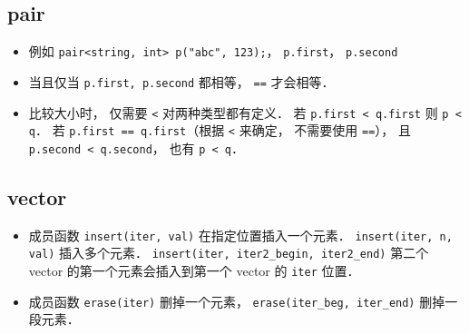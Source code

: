 
\begin{issues}
\issueDraft
\end{issues}

\subsection{pair}
\begin{itemize}
\item 例如 \verb|pair<string, int> p("abc", 123);|， \verb|p.first|， \verb|p.second|
\item 当且仅当 \verb|p.first, p.second| 都相等， \verb|==| 才会相等．
\item 比较大小时， 仅需要 \verb|<| 对两种类型都有定义． 若 \verb|p.first < q.first| 则 \verb|p < q|． 若 \verb|p.first == q.first|（根据 \verb|<| 来确定， 不需要使用 \verb|==|）， 且 \verb|p.second < q.second|， 也有 \verb|p < q|．
\end{itemize}

\subsection{vector}
\begin{itemize}
\item 成员函数 \verb|insert(iter, val)| 在指定位置插入一个元素． \verb|insert(iter, n, val)| 插入多个元素． \verb|insert(iter, iter2_begin, iter2_end)| 第二个 vector 的第一个元素会插入到第一个 vector 的 \verb|iter| 位置．
\item 成员函数 \verb|erase(iter)| 删掉一个元素， \verb|erase(iter_beg, iter_end)| 删掉一段元素．
\end{itemize}


